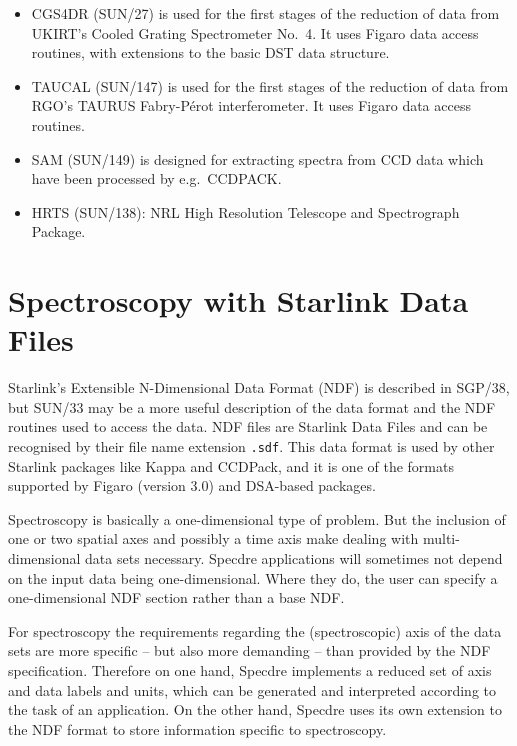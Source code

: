 \begin{itemize}
\item CGS4DR (SUN/27) is used for the first stages of the reduction of
   data from UKIRT's Cooled Grating Spectrometer No.\ 4. It uses Figaro
   data access routines, with extensions to the basic DST data
   structure.

\item TAUCAL (SUN/147) is used for the first stages of the reduction of
   data from RGO's TAURUS Fabry-P\'erot interferometer. It uses Figaro
   data access routines.

\item SAM (SUN/149) is designed for extracting spectra from CCD data
   which have been processed by e.g.\ CCDPACK.

\item HRTS (SUN/138): NRL High Resolution Telescope and Spectrograph
   Package.

\end{itemize}


\goodbreak
\section{Spectroscopy with Starlink Data Files}
\label{spandsdf}

Starlink's Extensible N-Dimensional Data Format (NDF) is described in SGP/38,
but SUN/33 may be a more useful description of the data format and the NDF
routines used to access the data. NDF files are Starlink Data Files and can be
recognised by their file name extension {\tt .sdf}. This data format is used by
other Starlink packages like Kappa and CCDPack, and it is one of the formats
supported by Figaro (version 3.0) and DSA-based packages.

Spectroscopy is basically a one-dimensional type of problem. But the inclusion
of one or two spatial axes and possibly a time axis make dealing with
multi-dimensional data sets necessary. Specdre applications will sometimes
not depend on the input data being one-dimensional. Where they do, the user can
specify a one-dimensional NDF section rather than a base NDF.

For spectroscopy the requirements regarding the (spectroscopic) axis of the
data sets are more specific -- but also more demanding -- than provided by the
NDF specification. Therefore on one hand, Specdre implements a reduced set of
axis and data labels and units, which can be generated and interpreted
according to the task of an application. On the other hand, Specdre uses its
own extension to the NDF format to store information specific to spectroscopy.


